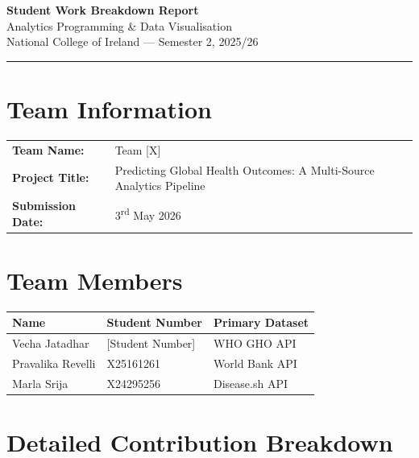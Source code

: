 \documentclass[12pt, a4paper]{article}
\begin{document}
\begin{center}
  {\Large\bfseries Student Work Breakdown Report}\\[8pt]
  {\large Analytics Programming \& Data Visualisation}\\[4pt]
  {\large National College of Ireland --- Semester 2, 2025/26}\\[12pt]
  \rule{\textwidth}{0.5pt}
\end{center}

\vspace{12pt}

\section*{Team Information}
\begin{tabular}{ll}
\textbf{Team Name:} & Team [X] \\
\textbf{Project Title:} & Predicting Global Health Outcomes: A Multi-Source Analytics Pipeline \\
\textbf{Submission Date:} & 3\textsuperscript{rd} May 2026 \\
\end{tabular}

\vspace{16pt}
\section*{Team Members}
\begin{tabular}{lll}
\toprule
\textbf{Name} & \textbf{Student Number} & \textbf{Primary Dataset} \\
\midrule
Vecha Jatadhar   & [Student Number] & WHO GHO API \\
Pravalika Revelli & X25161261        & World Bank API \\
Marla Srija       & X24295256        & Disease.sh API \\
\bottomrule
\end{tabular}

\vspace{20pt}
\section*{Detailed Contribution Breakdown}
\end{document}
